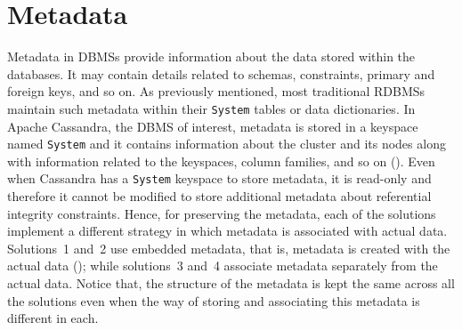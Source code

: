 \section{Metadata}\label{s:design-Metadata}
Metadata in \acp{DBMS} provide information about the data stored within the
databases.
It may contain details related to schemas, constraints,  primary and foreign
keys, and so on.   As previously mentioned,  most traditional \acp{RDBMS}
maintain such metadata within their \texttt{System}  tables or data
dictionaries.
In Apache Cassandra, the \ac{DBMS} of interest, metadata is stored in a keyspace
named \texttt{System} and it contains information about the cluster and its
nodes along with information related to the keyspaces, column families, and so
on ().
 Even when Cassandra has a  \texttt{System} keyspace to store metadata, it is
 read-only and therefore it cannot be modified to store additional metadata
 about referential integrity constraints.
Hence,  for preserving the metadata, each of the solutions implement a 
different strategy in which metadata is associated with actual data. Solutions~1
and~2 use embedded metadata, that is, metadata is created with the actual data
(); while solutions~3 and~4 associate metadata separately
from the actual data.  Notice that, the structure
 of the metadata is kept the same across all the solutions even when  the way of
 storing and associating this metadata is different in each.

